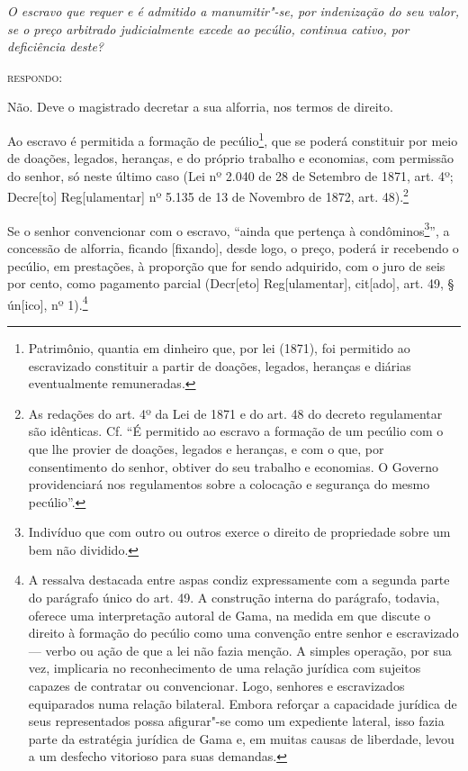 \emph{O escravo que requer e é admitido a
manumitir"-se, por indenização do seu valor, se o preço arbitrado
judicialmente excede ao pecúlio, continua cativo, por deficiência
deste?}

\textsc{respondo:}

Não. Deve o magistrado decretar a sua alforria, nos termos de direito.

\asterisc

Ao escravo é permitida a formação de pecúlio\footnote{Patrimônio,
  quantia em dinheiro que, por lei (1871), foi permitido ao escravizado
  constituir a partir de doações, legados, heranças e diárias
  eventualmente remuneradas.}, que se poderá constituir por meio de
doações, legados, heranças, e do próprio trabalho e economias, com
permissão do senhor, só neste último caso (Lei nº 2.040 de 28 de
Setembro de 1871, art. 4º; Decre{[}to{]} Reg{[}ulamentar{]} nº 5.135 de
13 de Novembro de 1872, art. 48).\footnote{As redações do art. 4º da
  Lei de 1871 e do art. 48 do decreto regulamentar são idênticas. Cf. ``É
  permitido ao escravo a formação de um pecúlio com o que lhe provier de
  doações, legados e heranças, e com o que, por consentimento do senhor,
  obtiver do seu trabalho e economias. O Governo providenciará nos
  regulamentos sobre a colocação e segurança do mesmo pecúlio''.}

Se o senhor convencionar com o escravo, ``ainda que pertença à
condôminos\footnote{Indivíduo que com outro ou outros exerce o
  direito de propriedade sobre um bem não dividido.}'', a concessão de
alforria, ficando {[}fixando{]}, desde logo, o preço, poderá ir
recebendo o pecúlio, em prestações, à proporção que for sendo adquirido,
com o juro de seis por cento, como pagamento parcial (Decr{[}eto{]}
Reg{[}ulamentar{]}, cit{[}ado{]}, art. 49, § ún{[}ico{]}, nº
1).\footnote{A ressalva destacada entre aspas condiz expressamente com
  a segunda parte do parágrafo único do art. 49. A construção interna do
  parágrafo, todavia, oferece uma interpretação autoral de Gama,
  na medida em que discute o direito à formação do pecúlio como uma
  convenção entre senhor e escravizado --- verbo ou ação de que a lei não
  fazia menção. A simples operação, por sua vez, implicaria no
  reconhecimento de uma relação jurídica com sujeitos capazes de
  contratar ou convencionar. Logo, senhores e escravizados equiparados
  numa relação bilateral. Embora reforçar a capacidade jurídica de seus
  representados possa afigurar"-se como um expediente lateral, isso fazia
  parte da estratégia jurídica de Gama e, em muitas causas de liberdade,
  levou a um desfecho vitorioso para suas demandas.}

